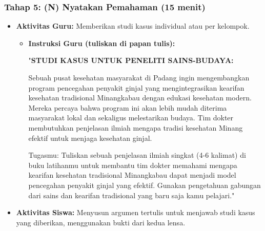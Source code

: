 \documentclass[a4paper,12pt]{article}
\begin{document}
\subsubsection{Tahap 5: (N) Nyatakan Pemahaman (15 menit)}
\begin{itemize}
\item \textbf{Aktivitas Guru:} Memberikan studi kasus individual atau per kelompok.
    \begin{itemize}
    \item \textbf{Instruksi Guru (tuliskan di papan tulis):}
    
    "\textbf{STUDI KASUS UNTUK PENELITI SAINS-BUDAYA:}
    
    Sebuah pusat kesehatan masyarakat di Padang ingin mengembangkan program pencegahan penyakit ginjal yang mengintegrasikan kearifan kesehatan tradisional Minangkabau dengan edukasi kesehatan modern. Mereka percaya bahwa program ini akan lebih mudah diterima masyarakat lokal dan sekaligus melestarikan budaya. Tim dokter membutuhkan penjelasan ilmiah mengapa tradisi kesehatan Minang efektif untuk menjaga kesehatan ginjal.
    
    Tugasmu: Tuliskan sebuah penjelasan ilmiah singkat (4-6 kalimat) di buku latihanmu untuk membantu tim dokter memahami mengapa kearifan kesehatan tradisional Minangkabau dapat menjadi model pencegahan penyakit ginjal yang efektif. Gunakan pengetahuan gabungan dari sains dan kearifan tradisional yang baru saja kamu pelajari."
    \end{itemize}
\item \textbf{Aktivitas Siswa:} Menyusun argumen tertulis untuk menjawab studi kasus yang diberikan, menggunakan bukti dari kedua lensa.
\end{itemize}
\end{document}
